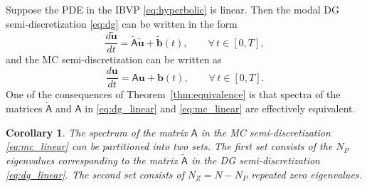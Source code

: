 \documentclass[pdflatex,sn-mathphys-num]{sn-jnl}%
\theoremstyle{thmstyleone}%
\newtheorem{coro}{Corollary}%
\theoremstyle{thmstyletwo}%
\theoremstyle{thmstylethree}%
\newcommand{\mat}[1]{\ensuremath{\mathsf{#1}}}
\begin{document}

Suppose the PDE in the IBVP \eqref{eq:hyperbolic} is linear.  Then the modal DG semi-discretization \eqref{eq:dg} can be written in the form 
\begin{equation}\label{eq:dg_linear}
\frac{d \tilde{\bm{u}}}{dt} = \tilde{\mat{A}} \tilde{\bm{u}} + \tilde{\bm{b}}(t),
\qquad\forall\, t \in [0,T],
\end{equation}
and the MC semi-discretization can be written as 
\begin{equation}\label{eq:mc_linear}
\frac{d \bm{u}}{dt} = \mat{A} \bm{u} + \bm{b}(t),
\qquad\forall\, t \in [0,T].
\end{equation}
One of the consequences of Theorem~\ref{thm:equivalence} is that spectra of the matrices $\tilde{\mat{A}}$ and $\mat{A}$ in \eqref{eq:dg_linear} and \eqref{eq:mc_linear} are effectively equivalent.

\begin{coro}\label{cor:spectrum}
The spectrum of the matrix $\mat{A}$ in the MC semi-discretization \eqref{eq:mc_linear} can be partitioned into two sets. The first set consists of the $N_P$ eigenvalues corresponding to the matrix $\tilde{\mat{A}}$ in the DG semi-discretization \eqref{eq:dg_linear}.  The second set consists of $N_Z = N - N_P$ repeated zero eigenvalues.
\end{coro}
\end{document}
